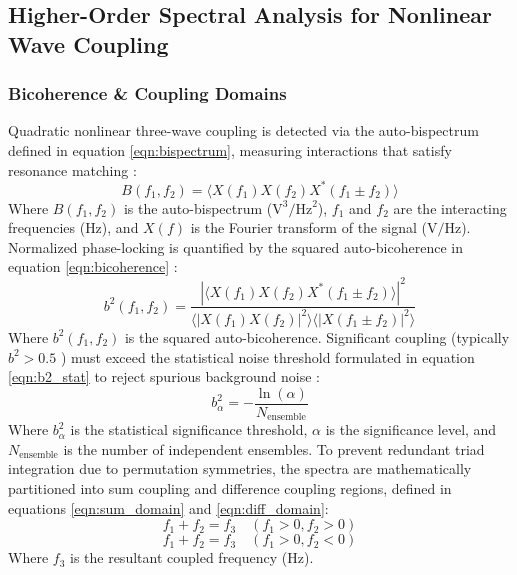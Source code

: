 \subsection{Higher-Order Spectral Analysis for Nonlinear Wave Coupling}

\subsubsection{Bicoherence \& Coupling Domains}
Quadratic nonlinear three-wave coupling is detected via the auto-bispectrum defined in equation \ref{eqn:bispectrum}, measuring interactions that satisfy resonance matching \cite{proakis2021digital, Hou2019, Fujisawa2021}:
\begin{equation}
\label{eqn:bispectrum}
B(f_1, f_2) = \langle X(f_1) X(f_2) X^*(f_1 \pm f_2) \rangle
\end{equation}
Where $B(f_1, f_2)$ is the auto-bispectrum ($\text{V}^3/\text{Hz}^2$), $f_1$ and $f_2$ are the interacting frequencies ($\text{Hz}$), and $X(f)$ is the Fourier transform of the signal ($\text{V}/\text{Hz}$). Normalized phase-locking is quantified by the squared auto-bicoherence in equation \ref{eqn:bicoherence} \cite{Hou2019, proakis2021digital}:
\begin{equation}
\label{eqn:bicoherence}
b^2(f_1, f_2) = \frac{|\langle X(f_1) X(f_2) X^*(f_1 \pm f_2) \rangle|^2}{\langle |X(f_1) X(f_2)|^2 \rangle \langle |X(f_1 \pm f_2)|^2 \rangle}
\end{equation}
Where $b^2(f_1, f_2)$ is the squared auto-bicoherence. Significant coupling (typically $b^2 > 0.5$ \cite{Singh2024}) must exceed the statistical noise threshold formulated in equation \ref{eqn:b2_stat} to reject spurious background noise \cite{Hou2019, Fujisawa2021}:
\begin{equation}
\label{eqn:b2_stat}
b^2_\alpha = -\frac{\ln(\alpha)}{N_{\text{ensemble}}}
\end{equation}
Where $b^2_\alpha$ is the statistical significance threshold, $\alpha$ is the significance level, and $N_{\text{ensemble}}$ is the number of independent ensembles. To prevent redundant triad integration due to permutation symmetries, the spectra are mathematically partitioned into sum coupling and difference coupling regions, defined in equations \ref{eqn:sum_domain} and \ref{eqn:diff_domain}:
\begin{equation}
\label{eqn:sum_domain}
f_1 + f_2 = f_3 \quad (f_1 > 0, f_2 > 0)
\end{equation}
\begin{equation}
\label{eqn:diff_domain}
f_1 + f_2 = f_3 \quad (f_1 > 0, f_2 < 0)
\end{equation}
Where $f_3$ is the resultant coupled frequency ($\text{Hz}$).

